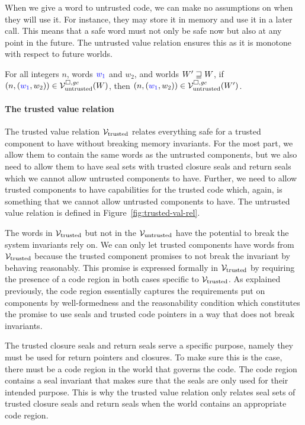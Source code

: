 \begin{jversion}
When we give a word to untrusted code, we can make no assumptions on when they will use it.
For instance, they may store it in memory and use it in a later call.
This means that a safe word must not only be safe now but also at any point in the future.
The untrusted value relation ensures this as it is monotone with respect to future worlds.
\begin{lemma}
  \label{lem:monotonicity}
  For all integers $n$, words ${\color{blue} w_1}$ and $w_2$, and worlds $W' \sqsupseteq W$, if $\left(n,({\color{blue} w_1},w_2)\right) \in \mathcal{V}^{\square,\mathit{gc}}_{\mathrm{untrusted}}(W)$, then $\left(n,({\color{blue} w_1},w_2)\right) \in \mathcal{V}^{\square,\mathit{gc}}_{\mathrm{untrusted}}(W')$.
\end{lemma}

\paragraph{The trusted value relation}
\label{par:trusted-val-rel}
The trusted value relation $\mathcal{V}_{\mathrm{trusted}}$ relates everything safe for a trusted component to have without breaking memory invariants.
For the most part, we allow them to contain the same words as the untrusted components, but we also need to allow them to have seal sets with trusted closure seals and return seals which we cannot allow untrusted components to have.
Further, we need to allow trusted components to have capabilities for the trusted code which, again, is something that we cannot allow untrusted components to have.
The untrusted value relation is defined in Figure~\ref{fig:trusted-val-rel}.

The words in $\mathcal{V}_{\mathrm{trusted}}$ but not in the $\mathcal{V}_{\mathrm{untrusted}}$ have the potential to break the system invariants \stktokens{} rely on.
We can only let trusted components have words from $\mathcal{V}_{\mathrm{trusted}}$ because the trusted component promises to not break the invariant by behaving reasonably.
This promise is expressed formally in $\mathcal{V}_{\mathrm{trusted}}$ by requiring the presence of a code region in both cases specific to $\mathcal{V}_{\mathrm{trusted}}$.
As explained previously, the code region essentially captures the requirements put on components by well-formedness and the reasonability condition which constitutes the promise to use seals and trusted code pointers in a way that does not break invariants.

The trusted closure seals and return seals serve a specific purpose, namely they must be used for return pointers and closures.
To make sure this is the case, there must be a code region in the world that governs the code.
The code region contains a seal invariant that makes sure that the seals are only used for their intended purpose.
This is why the trusted value relation only relates seal sets of trusted closure seals and return seals when the world contains an appropriate code region.


\end{jversion}
